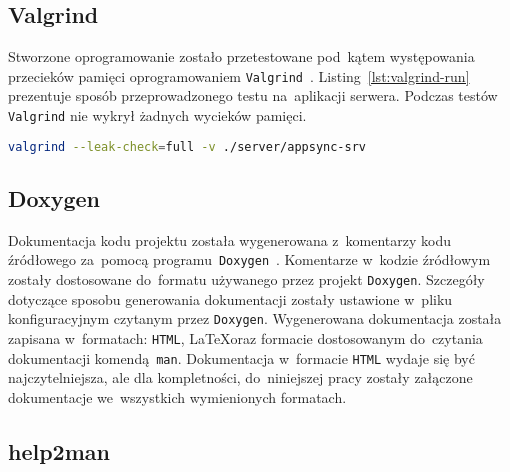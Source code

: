 \documentclass[thesis]{subfiles}
\begin{document}

\subsection{Valgrind}

Stworzone oprogramowanie zostało przetestowane pod~kątem występowania przecieków pamięci oprogramowaniem \texttt{Valgrind}~\cite{valgrind}. Listing~\ref{lst:valgrind-run} prezentuje sposób przeprowadzonego testu na~aplikacji serwera. Podczas testów \texttt{Valgrind} nie wykrył żadnych wycieków pamięci.

\begin{lstlisting}[label=lst:valgrind-run,language=bash,numbers=none,caption={Uruchomienie \texttt{Valgrind} w~trybie wykrywania wszystkich dostępnych testów wycieków pamięci na~aplikacji serwera }]
valgrind --leak-check=full -v ./server/appsync-srv
\end{lstlisting}


\subsection{Doxygen}

Dokumentacja kodu projektu została wygenerowana z~komentarzy kodu źródłowego za~pomocą programu~\texttt{Doxygen}~\cite{doxygen}. Komentarze w~kodzie źródłowym zostały dostosowane do~formatu używanego przez projekt \texttt{Doxygen}. Szczegóły dotyczące sposobu generowania dokumentacji zostały ustawione w~pliku konfiguracyjnym  czytanym przez \texttt{Doxygen}. Wygenerowana dokumentacja została zapisana w~formatach: \texttt{HTML}, \LaTeX oraz formacie dostosowanym do~czytania dokumentacji komendą~\texttt{man}. Dokumentacja w~formacie \texttt{HTML} wydaje się być najczytelniejsza, ale dla kompletności, do~niniejszej pracy zostały załączone dokumentacje we~wszystkich wymienionych formatach.

%
%


\subsection{help2man}
\end{document}
